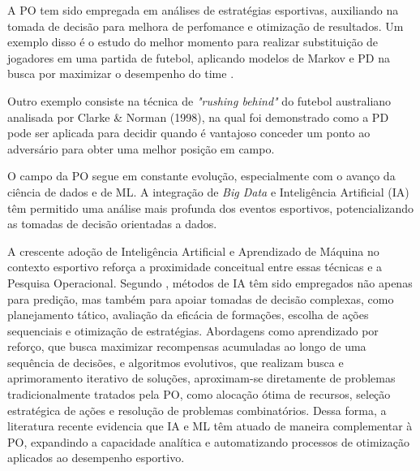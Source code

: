 A PO tem sido empregada em análises de estratégias esportivas, auxiliando na tomada de decisão para melhora de perfomance e otimização de resultados. 
Um exemplo disso é o estudo do melhor momento para realizar substituição de jogadores em uma partida de futebol, 
aplicando modelos de Markov e PD na busca por maximizar o desempenho do time \cite{Hirotsu2002}.

Outro exemplo consiste na técnica de \textit{"rushing behind"} do futebol australiano analisada por Clarke \& Norman (1998), 
na qual foi demonstrado como a PD pode ser aplicada para decidir quando é vantajoso conceder um ponto ao adversário para obter uma melhor posição em campo.

O campo da PO segue em constante evolução, especialmente com o avanço da ciência de dados e de ML. A integração de \textit{Big Data} e 
Inteligência Artificial (IA) têm permitido uma análise mais profunda dos eventos esportivos, potencializando as tomadas de decisão orientadas a dados.

A crescente adoção de Inteligência Artificial e Aprendizado de Máquina no contexto esportivo reforça a proximidade conceitual entre essas técnicas e a Pesquisa Operacional. 
Segundo \cite{Chmait2021}, métodos de IA têm sido empregados não apenas para predição, mas também para apoiar tomadas de decisão complexas, como planejamento tático, 
avaliação da eficácia de formações, escolha de ações sequenciais e otimização de estratégias. Abordagens como aprendizado por reforço, que busca maximizar recompensas 
acumuladas ao longo de uma sequência de decisões, e algoritmos evolutivos, que realizam busca e aprimoramento iterativo de soluções, aproximam-se diretamente de problemas 
tradicionalmente tratados pela PO, como alocação ótima de recursos, seleção estratégica de ações e resolução de problemas combinatórios. Dessa forma, a literatura recente 
evidencia que IA e ML têm atuado de maneira complementar à PO, expandindo a capacidade analítica e automatizando processos de otimização aplicados ao desempenho esportivo.

